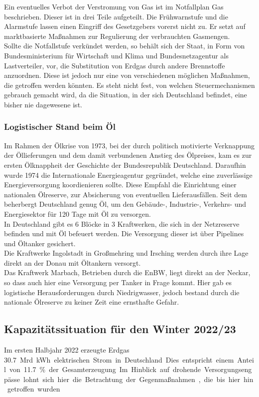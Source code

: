 		Ein eventuelles Verbot der Verstromung von Gas ist im Notfallplan Gas beschrieben. Dieser ist in drei Teile aufgeteilt. Die Frühwarnstufe und die Alarmstufe lassen einen Eingriff des Gesetzgebers vorerst nicht zu. Er setzt auf marktbasierte Maßnahmen zur Regulierung der verbrauchten Gasmengen. \\
		
		Sollte die Notfallstufe verkündet werden, so behält sich der Staat, in Form von Bundesministerium für Wirtschaft und Klima und Bundesnetzagentur als Lastverteiler, vor, die Substitution von Erdgas durch andere Brennstoffe anzuordnen. Diese ist jedoch nur eine von verschiedenen möglichen Maßnahmen, die getroffen werden könnten. Es steht nicht fest, von welchen Steuermechanismen gebrauch gemacht wird, da die Situation, in der sich Deutschland befindet, eine bisher nie dagewesene ist. 
		
		\subsubsection{Logistischer Stand beim Öl}
		Im Rahmen der Ölkrise von 1973, bei der durch politisch motivierte Verknappung der Öllieferungen und dem damit verbundenen Anstieg des Ölpreises, kam es zur ersten Ölknappheit der Geschichte der Bundesrepublik Deutschland. Daraufhin wurde 1974 die Internationale Energieagentur gegründet, welche eine zuverlässige Energieversorgung koordienieren sollte. Diese Empfahl die Einrichtung einer nationalen Ölreserve, zur Absicherung von eventuellen Lieferausfällen. Seit dem beherbergt Deutschland genug Öl, um den Gebäude-, Industrie-, Verkehrs- und Energiesektor für 120 Tage mit Öl zu versorgen.\\
		
		In Deutschland gibt es 6 Blöcke in 3 Kraftwerken, die sich in der Netzreserve befinden und mit Öl befeuert werden. Die Versorgung dieser ist über Pipelines und Öltanker gesichert.\\
		Die Kraftwerke Ingolstadt in Großmehring und Irsching werden durch ihre Lage direkt an der Donau mit Öltankern versorgt.\\
		Das Kraftwerk Marbach, Betrieben durch die EnBW, liegt direkt an der Neckar, so dass auch hier eine Versorgung per Tanker in Frage kommt. Hier gab es logistische Herausforderungen durch Niedrigwasser, jedoch bestand durch die nationale Ölreserve zu keiner Zeit eine ernsthafte Gefahr.\\
		
		
	\subsection{Kapazitätssituation für den Winter 2022/23}
	Im ersten Halbjahr 2022 erzeugte Erdgas \SI{30,7} Mrd. {kWh} elektrischen Strom in Deutschland. Dies entspricht einem Anteil von \SI{11,7}{\percent} der Gesamterzeugung. Im Hinblick auf drohende Versorgungsengpässe lohnt sich hier die Betrachtung der Gegenmaßnahmen, die bis hier hin getroffen wurden. \\
	
